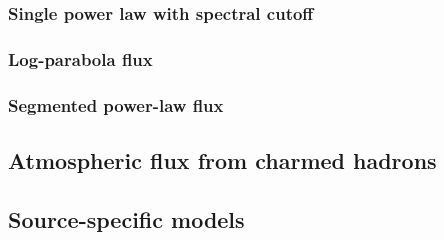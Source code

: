 \subsubsection{Single power law with spectral cutoff\label{sec:cutoff}}
\begingroup
\graphicspath{{results/HESE_Final_Paper/}}

\endgroup
\FloatBarrier

\subsubsection{Log-parabola flux\label{sec:log_parabola}}
\begingroup
\graphicspath{{results/HESE_Final_Paper/}}

\endgroup
\FloatBarrier

\subsubsection{Segmented power-law flux\label{sec:unfolding}}
\begingroup
\graphicspath{{results/HESE_Final_Paper/}}

\endgroup
\FloatBarrier

\subsection{Atmospheric flux from charmed hadrons\label{sec:prompt}}
\begingroup
\graphicspath{{results/HESE_Final_Paper/}}

\endgroup
\FloatBarrier

\subsection{Source-specific models\label{sec:specific_models}}
\begingroup
\graphicspath{{results/HESE_Final_Paper/}}

\endgroup
\FloatBarrier